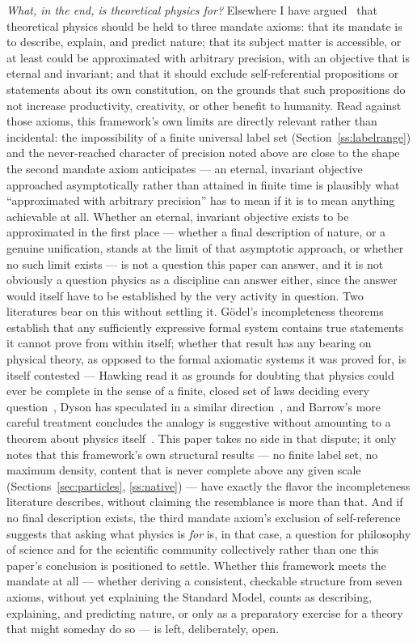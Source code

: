 \documentclass[pdflatex,sn-mathphys-num]{sn-jnl}
\theoremstyle{thmstyleone}
\theoremstyle{thmstylethree}
\theoremstyle{thmstyletwo}
\begin{document}
\emph{What, in the end, is theoretical physics for?} Elsewhere I have
argued~\cite{Yang2026Mandate} that theoretical physics should be held to
three mandate axioms: that its mandate is to describe, explain, and
predict nature; that its subject matter is accessible, or at least could
be approximated with arbitrary precision, with an objective that is
eternal and invariant; and that it should exclude self-referential
propositions or statements about its own constitution, on the grounds
that such propositions do not increase productivity, creativity, or
other benefit to humanity. Read against those axioms, this framework's
own limits are directly relevant rather than incidental: the impossibility
of a finite universal label set (Section~\ref{ss:labelrange}) and the
never-reached character of precision noted above are close to the shape
the second mandate axiom anticipates — an eternal, invariant objective
approached asymptotically rather than attained in finite time is
plausibly what ``approximated with arbitrary precision'' has to mean if
it is to mean anything achievable at all. Whether an eternal, invariant
objective exists to be approximated in the first place — whether a final
description of nature, or a genuine unification, stands at the limit of
that asymptotic approach, or whether no such limit exists — is not a
question this paper can answer, and it is not obviously a question
physics as a discipline can answer either, since the answer would itself
have to be established by the very activity in question. Two literatures
bear on this without settling it. G\"odel's incompleteness
theorems~\cite{Godel1931} establish that any sufficiently expressive
formal system contains true statements it cannot prove from within
itself; whether that result has any bearing on physical theory, as
opposed to the formal axiomatic systems it was proved for, is itself
contested — Hawking read it as grounds for doubting that physics could
ever be complete in the sense of a finite, closed set of laws deciding
every question~\cite{Hawking2002}, Dyson has speculated in a similar
direction~\cite{Dyson2009}, and Barrow's more careful treatment concludes
the analogy is suggestive without amounting to a theorem about physics
itself~\cite{Barrow2011}. This paper takes no side in that dispute; it
only notes that this framework's own structural results — no finite
label set, no maximum density, content that is never complete above any
given scale (Sections~\ref{sec:particles}, \ref{ss:native}) — have
exactly the flavor the incompleteness literature describes, without
claiming the resemblance is more than that. And if no final description
exists, the third mandate axiom's exclusion of self-reference suggests
that asking what physics is \emph{for} is, in that case, a question for
philosophy of science and for the scientific community collectively
rather than one this paper's conclusion is positioned to settle. Whether
this framework meets the mandate at all — whether deriving a consistent,
checkable structure from seven axioms, without yet explaining the
Standard Model, counts as describing, explaining, and predicting nature,
or only as a preparatory exercise for a theory that might someday do so
— is left, deliberately, open.
\end{document}
